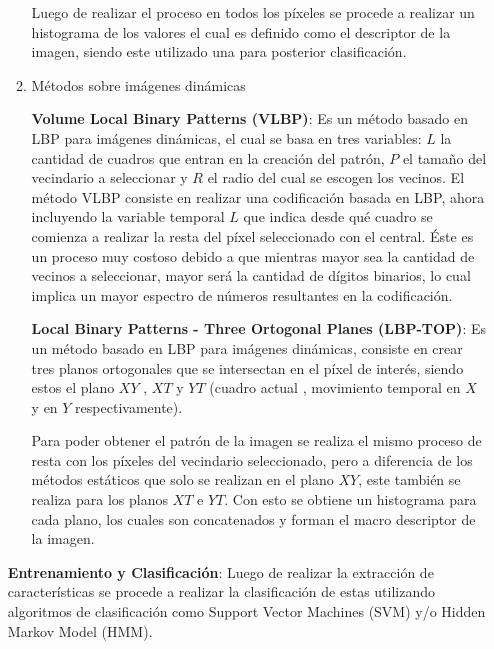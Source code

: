 \documentclass{article}
\begin{document}
\begin{enumerate}
\begin{enumerate}
Luego de realizar el proceso en todos los píxeles se procede a realizar un histograma de los valores el cual es definido como el descriptor de la imagen, siendo este utilizado una para posterior clasificación.


                \item Métodos sobre imágenes dinámicas
                
                    \textbf{Volume Local Binary Patterns (VLBP)}:
                    Es un método basado en LBP para imágenes dinámicas, el cual se basa en tres variables: $L$ la cantidad de cuadros que entran en la creación del patrón, $P$ el tamaño del vecindario a seleccionar y $R$ el radio del cual se escogen los vecinos. 
El método VLBP consiste en realizar una codificación basada en LBP, ahora incluyendo la variable temporal $L$ que indica desde qué cuadro se comienza a realizar la resta del píxel seleccionado con el central.
Éste es un proceso muy costoso debido a que mientras mayor sea la cantidad de vecinos a seleccionar, mayor será la cantidad de dígitos binarios, lo cual implica un mayor espectro de números resultantes en la codificación.

                    \textbf{Local Binary Patterns - Three Ortogonal Planes (LBP-TOP)}:
                    Es un método basado en LBP para imágenes dinámicas, consiste en crear tres planos ortogonales que se intersectan en el píxel de interés, siendo estos el plano $XY$ , $XT$ y $YT$ (cuadro actual , movimiento temporal en $X$ y en $Y$ respectivamente). 

Para poder obtener el patrón de la imagen se realiza el mismo proceso de resta con los píxeles del vecindario seleccionado, pero a diferencia de los métodos estáticos que solo se realizan en el plano $XY$, este también se realiza para los planos $XT$ e $YT$. Con esto se obtiene un histograma para cada plano, los cuales son concatenados y forman el macro descriptor de la imagen.

            \end{enumerate}
        \textbf{Entrenamiento y Clasificación}: 
        Luego de realizar la extracción de características se procede a realizar la clasificación de estas utilizando algoritmos de clasificación como Support Vector Machines (SVM) y/o  Hidden Markov Model (HMM).
    
        
        \end{enumerate}
\end{document}
